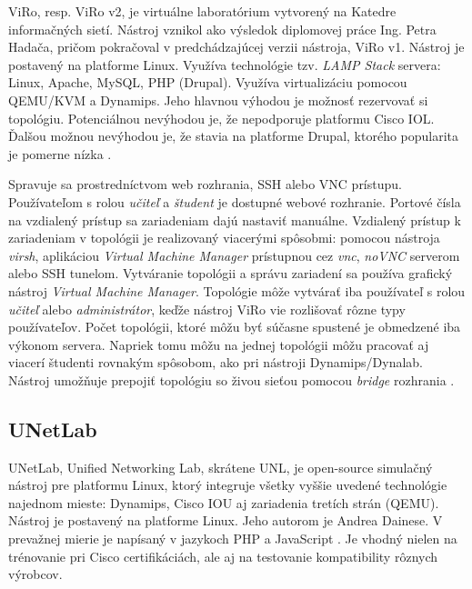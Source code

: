 ViRo, resp. ViRo v2, je virtuálne laboratórium vytvorený na Katedre informačných sietí. Nástroj vznikol ako výsledok diplomovej práce Ing. Petra Hadača, pričom pokračoval v predchádzajúcej verzii nástroja, ViRo v1. Nástroj je postavený na platforme Linux. Využíva technológie tzv. \emph{LAMP Stack} servera: Linux, Apache, MySQL, PHP (Drupal). Využíva virtualizáciu pomocou QEMU/KVM a Dynamips. Jeho hlavnou výhodou je možnosť rezervovať si topológiu. Potenciálnou nevýhodou je, že nepodporuje platformu Cisco IOL. Ďalšou možnou nevýhodou je, že stavia na platforme Drupal, ktorého popularita je pomerne nízka \cite{stackoverflow_survey}.

Spravuje sa prostredníctvom web rozhrania, SSH alebo VNC prístupu. Používateľom s rolou \emph{učiteľ} a \emph{študent} je dostupné webové rozhranie. Portové čísla na vzdialený prístup sa zariadeniam dajú nastaviť manuálne. Vzdialený prístup k zariadeniam v topológii je realizovaný viacerými spôsobmi: pomocou nástroja \emph{virsh}, aplikáciou \emph{Virtual Machine Manager} prístupnou cez \emph{vnc}, \emph{noVNC} serverom alebo SSH tunelom. Vytváranie topológii a správu zariadení sa používa grafický nástroj \emph{Virtual Machine Manager}. Topológie môže vytvárať iba používateľ s rolou  \emph{učiteľ} alebo \emph{administrátor}, keďže nástroj ViRo vie rozlišovať rôzne typy používateľov. Počet topológii, ktoré môžu byť súčasne spustené je obmedzené iba výkonom servera. Napriek tomu môžu na jednej topológii môžu pracovať aj viacerí študenti rovnakým spôsobom, ako pri nástroji Dynamips/Dynalab. Nástroj umožňuje prepojiť topológiu so živou sieťou pomocou \emph{bridge} rozhrania \cite{viro_hadac}.

\subsection{UNetLab}

UNetLab, Unified Networking Lab, skrátene UNL, je open-source  simulačný nástroj pre platformu Linux, ktorý integruje všetky vyššie uvedené technológie najednom mieste: Dynamips, Cisco IOU aj zariadenia tretích strán (QEMU). Nástroj je postavený na platforme Linux. Jeho autorom je Andrea Dainese. V prevažnej mierie je napísaný v jazykoch PHP a JavaScript \cite{webiou_unetlab_unetlabv2, unetlab_github}. Je vhodný nielen na trénovanie pri Cisco certifikáciách, ale aj na testovanie kompatibility rôznych výrobcov.

